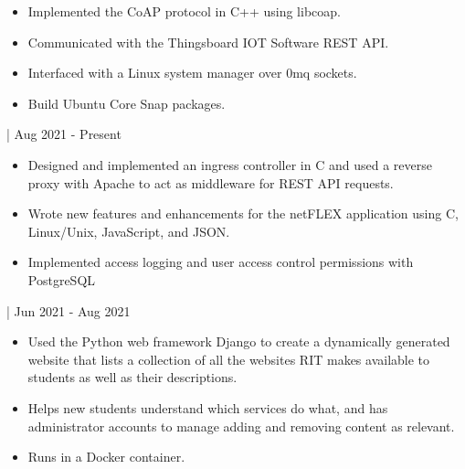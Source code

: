 \documentclass[11pt,letterpaper,ragged2e]{altacv}
\begin{document}

\begin{fullwidth}
\makecvheader
\end{fullwidth}




{
\begin{itemize}
    \item Implemented the CoAP protocol in C++ using libcoap.
    \item Communicated with the Thingsboard IOT Software REST API.
    \item Interfaced with a Linux system manager over 0mq sockets.
    \item Build Ubuntu Core Snap packages.
\end{itemize}
}
{| Aug 2021 - Present} \

{
\begin{itemize}
    \item Designed and implemented an ingress controller in C and used a reverse proxy with Apache to act as middleware for REST API requests. 
    \item Wrote new features and enhancements for the netFLEX application using C, Linux/Unix, JavaScript, and JSON.
    \item Implemented access logging and user access control permissions with PostgreSQL
\end{itemize}
}
{| Jun 2021 - Aug 2021} \


{
\begin{itemize}
    \item Used the Python web framework Django to create a dynamically generated website that lists a collection of all the websites RIT makes available to students as well as their descriptions.
    \item Helps new students understand which services do what, and has administrator accounts to manage adding and removing content as relevant.
    \item Runs in a Docker container.
\end{itemize}
}
{}
\end{document}
